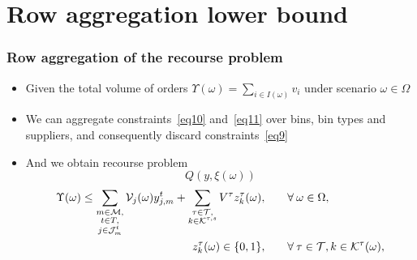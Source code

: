 \documentclass[9pt,xcolor={dvipsnames}]{beamer}
\begin{document}
\section{Row aggregation lower bound}
\begin{frame}[allowframebreaks]
	\frametitle{Row aggregation of the recourse problem}
	\begin{itemize}
		\item Given the total volume of orders $\Upsilon (\omega) = \sum\limits_{i \in I(\omega)} v_i$ under scenario $ \omega \in \Omega$
		\bigskip
		\item We can aggregate constraints~\eqref{eq10} and~\eqref{eq11} over bins, bin types and suppliers, and consequently discard constraints~\eqref{eq9}
		\bigskip
		\item And we obtain recourse problem
		{
			\footnotesize
			\begin{equation*}
				Q \left(y,\xi (\omega)\right)
			\end{equation*}
			\begin{alignat}{2}
				\Upsilon (\omega) \leq \sum\limits_{\substack{ m \in {\cal M}, \\ t \in T, \\ j \in {\cal J}^t_{m}}} {\cal V}_{j}(\omega) y_{j,m}^t + \sum\limits_{\substack{\tau \in {\cal T}, \\ k \in {\cal K}^{\tau,s}}} V^\tau z^{\tau}_k(\omega), & \qquad \forall \: \omega \in \Omega, \label{eq10lb}\\
				z_k^{\tau}(\omega) \in \{0, 1\}, & \qquad \forall \: \tau \in {\cal T}, k \in {\cal K}^{\tau}(\omega), \label{eq14lb}
			\end{alignat}
		}
	\end{itemize}
\end{frame}
\end{document}
